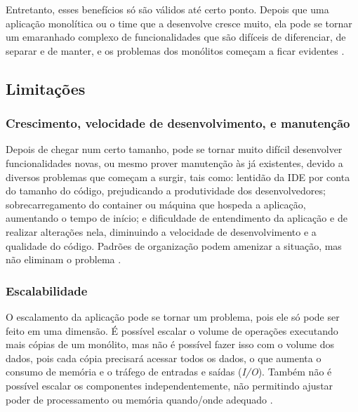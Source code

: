 Entretanto, esses benefícios só são válidos até certo ponto. Depois que uma aplicação monolítica ou o time que a desenvolve cresce muito, ela pode se tornar um emaranhado complexo de funcionalidades que são difíceis de diferenciar, de separar e de manter, e os problemas dos monólitos começam a ficar evidentes \cite{microservicesIO_monolithic_architecture}.

\subsection{Limitações}\label{subsection-monolitos-limitacoes}

\subsubsection{Crescimento, velocidade de desenvolvimento, e manutenção}
Depois de chegar num certo tamanho, pode se tornar muito difícil desenvolver funcionalidades novas, ou mesmo prover manutenção às já existentes, devido a diversos problemas que começam a surgir, tais como: lentidão da IDE por conta do tamanho do código, prejudicando a produtividade dos desenvolvedores; sobrecarregamento do container ou máquina que hospeda a aplicação, aumentando o tempo de início; e dificuldade de entendimento da aplicação e de realizar alterações nela, diminuindo a velocidade de desenvolvimento e a qualidade do código. Padrões de organização podem amenizar a situação, mas não eliminam o problema \cite{microservicesIO_monolithic_architecture}.

\subsubsection{Escalabilidade}
O escalamento da aplicação pode se tornar um problema, pois ele só pode ser feito em uma dimensão. É possível escalar o volume de operações executando mais cópias de um monólito, mas não é possível fazer isso com o volume dos dados, pois cada cópia precisará acessar todos os dados, o que aumenta o consumo de memória e o tráfego de entradas e saídas (\emph{I/O}). Também não é possível escalar os componentes independentemente, não permitindo ajustar poder de processamento ou memória quando/onde adequado \cite{microservicesIO_monolithic_architecture}.


